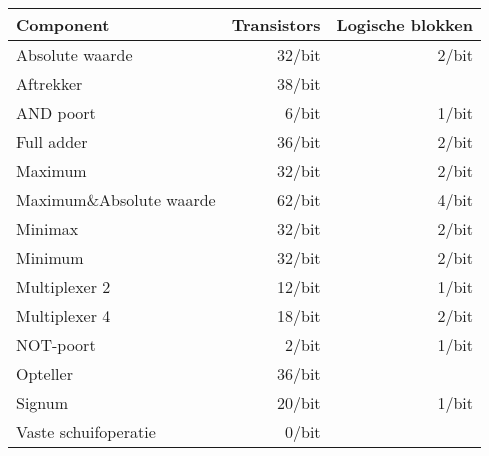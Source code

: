 \begin{tabular}{l|rr}
Component&Transistors&Logische blokken\\\hline
Absolute waarde&32/bit&2/bit\\
Aftrekker&38/bit&\\
AND poort&6/bit&1/bit\\
Full adder&36/bit&2/bit\\
Maximum&32/bit&2/bit\\
Maximum\&Absolute waarde&62/bit&4/bit\\
Minimax&32/bit&2/bit\\
Minimum&32/bit&2/bit\\
Multiplexer 2&12/bit&1/bit\\
Multiplexer 4&18/bit&2/bit\\
NOT-poort&2/bit&1/bit\\
Opteller&36/bit&\\
Signum&20/bit&1/bit\\
Vaste schuifoperatie&0/bit&\\
\end{tabular}